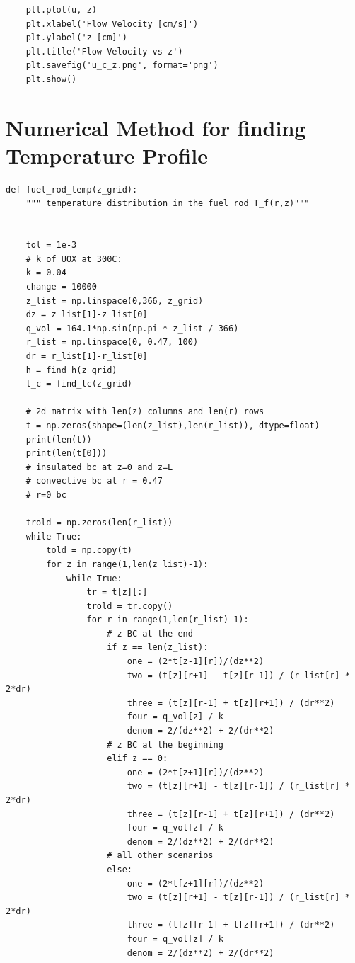 \documentclass[12pt,letterpaper]{article}
\begin{document}
\begin{appendices}
\begin{verbatim}
    plt.plot(u, z)
    plt.xlabel('Flow Velocity [cm/s]')
    plt.ylabel('z [cm]')
    plt.title('Flow Velocity vs z')
    plt.savefig('u_c_z.png', format='png')
    plt.show() 
\end{verbatim}

\section{Numerical Method for finding Temperature Profile}
\begin{verbatim}
def fuel_rod_temp(z_grid):
    """ temperature distribution in the fuel rod T_f(r,z)"""


    tol = 1e-3
    # k of UOX at 300C:
    k = 0.04 
    change = 10000
    z_list = np.linspace(0,366, z_grid)
    dz = z_list[1]-z_list[0]
    q_vol = 164.1*np.sin(np.pi * z_list / 366)
    r_list = np.linspace(0, 0.47, 100)
    dr = r_list[1]-r_list[0]
    h = find_h(z_grid)
    t_c = find_tc(z_grid)

    # 2d matrix with len(z) columns and len(r) rows
    t = np.zeros(shape=(len(z_list),len(r_list)), dtype=float)
    print(len(t))
    print(len(t[0]))
    # insulated bc at z=0 and z=L
    # convective bc at r = 0.47
    # r=0 bc

    trold = np.zeros(len(r_list))
    while True:
        told = np.copy(t)
        for z in range(1,len(z_list)-1):
            while True:
                tr = t[z][:]
                trold = tr.copy()
                for r in range(1,len(r_list)-1):
                    # z BC at the end
                    if z == len(z_list):
                        one = (2*t[z-1][r])/(dz**2)
                        two = (t[z][r+1] - t[z][r-1]) / (r_list[r] * 2*dr)
                        three = (t[z][r-1] + t[z][r+1]) / (dr**2)
                        four = q_vol[z] / k
                        denom = 2/(dz**2) + 2/(dr**2) 
                    # z BC at the beginning
                    elif z == 0:
                        one = (2*t[z+1][r])/(dz**2)
                        two = (t[z][r+1] - t[z][r-1]) / (r_list[r] * 2*dr)
                        three = (t[z][r-1] + t[z][r+1]) / (dr**2)
                        four = q_vol[z] / k
                        denom = 2/(dz**2) + 2/(dr**2) 
                    # all other scenarios
                    else:
                        one = (2*t[z+1][r])/(dz**2)
                        two = (t[z][r+1] - t[z][r-1]) / (r_list[r] * 2*dr)
                        three = (t[z][r-1] + t[z][r+1]) / (dr**2)
                        four = q_vol[z] / k
                        denom = 2/(dz**2) + 2/(dr**2) 


\end{verbatim}
\end{appendices}
\end{document}
